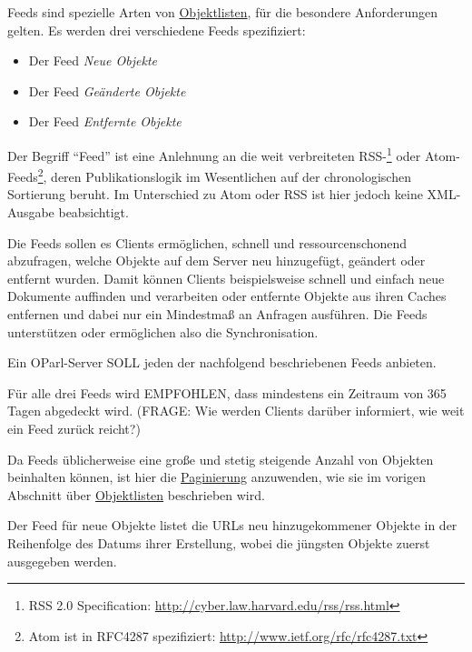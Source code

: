 \documentclass[,a4paper]{article}
\begin{document}
Feeds sind spezielle Arten von \hyperref[objektlisten]{Objektlisten},
für die besondere Anforderungen gelten. Es werden drei verschiedene
Feeds spezifiziert:

\begin{itemize}
\itemsep1pt\parskip0pt
\item
  Der Feed \emph{Neue Objekte}
\item
  Der Feed \emph{Geänderte Objekte}
\item
  Der Feed \emph{Entfernte Objekte}
\end{itemize}

Der Begriff ``Feed'' ist eine Anlehnung an die weit verbreiteten
RSS-\footnote{RSS 2.0 Specification:
  \url{http://cyber.law.harvard.edu/rss/rss.html}} oder
Atom-Feeds\footnote{Atom ist in RFC4287 spezifiziert:
  \url{http://www.ietf.org/rfc/rfc4287.txt}}, deren Publikationslogik im
Wesentlichen auf der chronologischen Sortierung beruht. Im Unterschied
zu Atom oder RSS ist hier jedoch keine XML-Ausgabe beabsichtigt.

Die Feeds sollen es Clients ermöglichen, schnell und ressourcenschonend
abzufragen, welche Objekte auf dem Server neu hinzugefügt, geändert oder
entfernt wurden. Damit können Clients beispielsweise schnell und einfach
neue Dokumente auffinden und verarbeiten oder entfernte Objekte aus
ihren Caches entfernen und dabei nur ein Mindestmaß an Anfragen
ausführen. Die Feeds unterstützen oder ermöglichen also die
Synchronisation.

Ein OParl-Server SOLL jeden der nachfolgend beschriebenen Feeds
anbieten.

Für alle drei Feeds wird EMPFOHLEN, dass mindestens ein Zeitraum von 365
Tagen abgedeckt wird. (FRAGE: Wie werden Clients darüber informiert, wie
weit ein Feed zurück reicht?)

Da Feeds üblicherweise eine große und stetig steigende Anzahl von
Objekten beinhalten können, ist hier die
\hyperref[paginierung]{Paginierung} anzuwenden, wie sie im vorigen
Abschnitt über \hyperref[objektlisten]{Objektlisten} beschrieben wird.


Der Feed für neue Objekte listet die URLs neu hinzugekommener Objekte in
der Reihenfolge des Datums ihrer Erstellung, wobei die jüngsten Objekte
zuerst ausgegeben werden.
\end{document}
